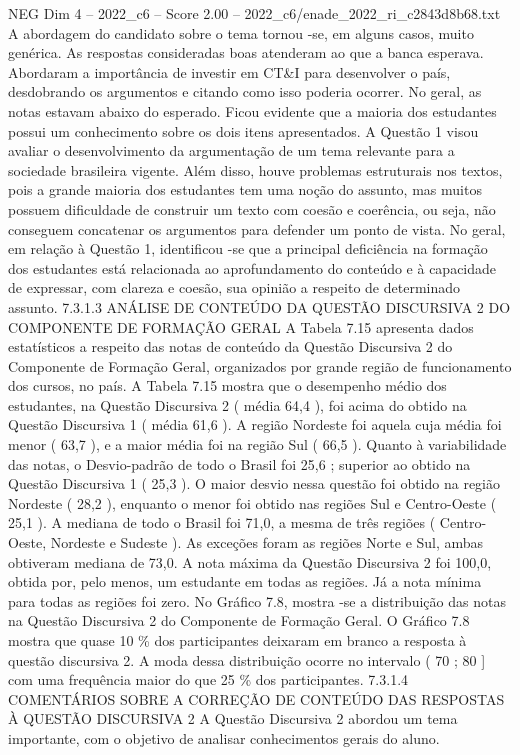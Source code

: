 \begin{textsample}{NEG Dim 4 – 2022\_c6 – Score 2.00 – 2022\_c6/enade\_2022\_ri\_c2843d8b68.txt}
A abordagem do candidato sobre o tema tornou -se, em alguns casos, muito genérica.
As respostas consideradas boas atenderam ao que a banca esperava.
Abordaram a importância de investir em CT\&I para desenvolver o país, desdobrando os argumentos e citando como isso poderia ocorrer.
No geral, as notas estavam abaixo do esperado.
Ficou evidente que a maioria dos estudantes possui um conhecimento sobre os dois itens apresentados.
A Questão 1 visou avaliar o desenvolvimento da argumentação de um tema relevante para a sociedade brasileira vigente.
Além disso, houve problemas estruturais nos textos, pois a grande maioria dos estudantes tem uma noção do assunto, mas muitos possuem dificuldade de construir um texto com coesão e coerência, ou seja, não conseguem concatenar os argumentos para defender um ponto de vista.
No geral, em relação à Questão 1, identificou -se que a principal deficiência na formação dos estudantes está relacionada ao aprofundamento do conteúdo e à capacidade de expressar, com clareza e coesão, sua opinião a respeito de determinado assunto. 7.3.1.3 ANÁLISE DE CONTEÚDO DA QUESTÃO DISCURSIVA 2 DO COMPONENTE DE FORMAÇÃO GERAL A Tabela 7.15 apresenta dados estatísticos a respeito das notas de conteúdo da Questão Discursiva 2 do Componente de Formação Geral, organizados por grande região de funcionamento dos cursos, no país.
A Tabela 7.15 mostra que o desempenho médio dos estudantes, na Questão Discursiva 2 ( média 64,4 ), foi acima do obtido na Questão Discursiva 1 ( média 61,6 ).
A região Nordeste foi aquela cuja média foi menor ( 63,7 ), e a maior média foi na região Sul ( 66,5 ).
Quanto à variabilidade das notas, o Desvio-padrão de todo o Brasil foi 25,6 ; superior ao obtido na Questão Discursiva 1 ( 25,3 ).
O maior desvio nessa questão foi obtido na região Nordeste ( 28,2 ), enquanto o menor foi obtido nas regiões Sul e Centro-Oeste ( 25,1 ).
A mediana de todo o Brasil foi 71,0, a mesma de três regiões ( Centro-Oeste, Nordeste e Sudeste ).
As exceções foram as regiões Norte e Sul, ambas obtiveram mediana de 73,0.
A nota máxima da Questão Discursiva 2 foi 100,0, obtida por, pelo menos, um estudante em todas as regiões.
Já a nota mínima para todas as regiões foi zero.
No Gráfico 7.8, mostra -se a distribuição das notas na Questão Discursiva 2 do Componente de Formação Geral.
O Gráfico 7.8 mostra que quase 10 \% dos participantes deixaram em branco a resposta à questão discursiva 2.
A moda dessa distribuição ocorre no intervalo ( 70 ; 80 ] com uma frequência maior do que 25 \% dos participantes. 7.3.1.4 COMENTÁRIOS SOBRE A CORREÇÃO DE CONTEÚDO DAS RESPOSTAS À QUESTÃO DISCURSIVA 2 A Questão Discursiva 2 abordou um tema importante, com o objetivo de analisar conhecimentos gerais do aluno.

\end{textsample}
